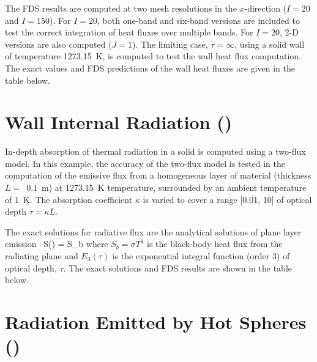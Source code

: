 \documentclass[11pt]{book}
\begin{document}
The FDS results are computed at two mesh resolutions in the $x$-direction ($I=20$ and $I=150$). For $I=20$, both one-band and six-band versions are
included to test the correct integration of heat fluxes over multiple bands. For $I=20$, 2-D versions are also computed ($J=1$). The limiting case, $\tau=\infty$,
using a solid wall of temperature 1273.15~K, is computed to test the wall heat flux computation. The exact values and FDS predictions of
the wall heat fluxes are given in the table below.



\section{Wall Internal Radiation (\texorpdfstring{}{wall\_internal\_radiation}) }
\label{wall_internal_radiation}

In-depth absorption of thermal radiation in a solid is computed using a two-flux model.  In this example, the accuracy of the two-flux model is tested in the computation of the emissive flux from a homogeneous layer of material (thickness $L=$~0.1~m) at 1273.15~K temperature, surrounded by an ambient temperature of 1~K. The absorption coefficient $\kappa$ is varied to cover a range [0.01, 10] of optical depth $\tau = \kappa L$.

The exact solutions for radiative flux are the analytical solutions of plane layer emission~\cite{Zeldovich:1}
\be
   S(\tau) = S_b
\ee
where $S_b = \sigma T^4$ is the black-body heat flux from the radiating plane and $E_3(\tau)$ is the exponential integral function (order 3) of optical depth, $\tau$. The exact solutions and FDS results are shown in the table below.




\section{Radiation Emitted by Hot Spheres (\texorpdfstring{}{hot\_spheres}) }
\label{hot_spheres}
\end{document}
